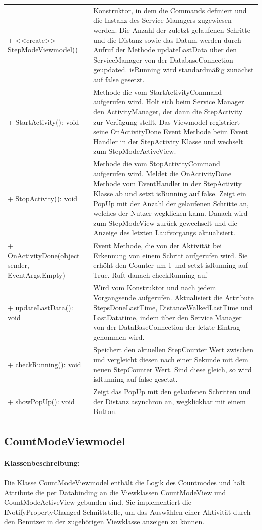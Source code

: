 \documentclass[a4paper,12pt]{article}
\begin{document}
\begin{tabular}{p{7cm}p{10cm}}
+ <<create>> StepModeViewmodel() & Konstruktor, in dem die Commands definiert und die Instanz des Service Managers zugewiesen werden. Die Anzahl der zuletzt gelaufenen Schritte und die Distanz sowie das Datum werden durch Aufruf der Methode updateLastData über den ServiceManager von der DatabaseConnection geupdated. isRunning wird standardmäßig zunächst auf false gesetzt.\\
+ StartActivity(): void & Methode die vom StartActivityCommand aufgerufen wird. Holt sich beim Service Manager den ActivityManager, der dann die StepActivity zur Verfügung stellt. Das Viewmodel registriert seine OnActivityDone Event Methode beim Event Handler in der StepActivity Klasse und wechselt zum StepModeActiveView. \\
+ StopActivity(): void & Methode die vom StopActivityCommand aufgerufen wird. Meldet die OnActivityDone Methode vom EventHandler in der StepActivity Klasse ab und setzt isRunning auf false. Zeigt ein PopUp mit der Anzahl der gelaufenen Schritte an, welches der Nutzer wegklicken kann. Danach wird zum StepModeView zurück gewechselt und die Anzeige des letzten Laufvorgangs aktualisiert. \\
+ OnActivityDone(object sender, EventArgs.Empty) & Event Methode, die von der Aktivität bei Erkennung von einem Schritt aufgerufen wird. Sie erhöht den Counter um 1 und setzt isRunning auf True. Ruft danach checkRunning auf \\
+ updateLastData(): void & Wird vom Konstruktor und nach jedem Vorgangsende aufgerufen. Aktualisiert die Attribute StepsDoneLastTime, DistanceWalkedLastTime und LastDatatime, indem über den Service Manager von der DataBaseConnection der letzte Eintrag genommen wird. \\
+ checkRunning(): void & Speichert den aktuellen StepCounter Wert zwischen und vergleicht diesen nach einer Sekunde mit dem neuen StepCounter Wert. Sind diese gleich, so wird isRunning auf false gesetzt. \\
+ showPopUp(): void & Zeigt das PopUp mit den gelaufenen Schritten und der Distanz asynchron an, wegklickbar mit einem Button. \\
\end{tabular}

\subsection{CountModeViewmodel}
\paragraph{Klassenbeschreibung:}
Die Klasse CountModeViewmodel enthält die Logik des Countmodes und hält Attribute die per Databinding an die Viewklassen CountModeView und CountModeActiveView gebunden sind. Sie implementiert die INotifyPropertyChanged Schnittstelle, um das Auswählen einer Aktivität durch den Benutzer in der zugehörigen Viewklasse anzeigen zu können.
\end{document}
